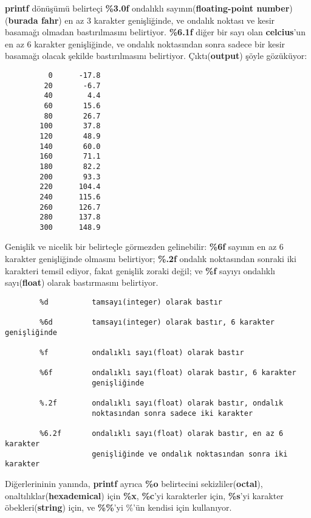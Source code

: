 \documentclass[a4paper,12pt,oneside]{book}
\begin{document}
\par \textbf{printf} dönüşümü belirteçi \textbf{\%3.0f} ondalıklı sayının(\textbf{floating-point number}) (\textbf{burada fahr}) en az 3 karakter genişliğinde, ve ondalık noktası ve kesir basamağı olmadan bastırılmasını belirtiyor. \textbf{\%6.1f} diğer bir sayı olan \textbf{celcius}'un  en az 6 karakter genişliğinde, ve ondalık noktasından sonra sadece bir kesir basamağı olacak şekilde bastırılmasını belirtiyor.
Çıktı(\textbf{output}) şöyle gözüküyor:
\begin{lstlisting}
          0      -17.8
         20       -6.7
         40        4.4
         60       15.6
         80       26.7
        100       37.8
        120       48.9
        140       60.0
        160       71.1
        180       82.2
        200       93.3
        220      104.4
        240      115.6
        260      126.7
        280      137.8
        300      148.9
\end{lstlisting}

Genişlik ve nicelik bir belirteçle görmezden gelinebilir: \textbf{\%6f} sayının en az 6 karakter genişliğinde olmasını belirtiyor; \textbf{\%.2f} ondalık noktasından sonraki iki karakteri temsil ediyor, fakat genişlik zoraki değil; ve \textbf{\%f} sayıyı ondalıklı sayı(\textbf{float}) olarak bastırmasını belirtiyor. \pagebreak

\begin{lstlisting}
        %d          tamsayı(integer) olarak bastır

        %6d         tamsayı(integer) olarak bastır, 6 karakter genişliğinde

        %f          ondalıklı sayı(float) olarak bastır

        %6f         ondalıklı sayı(float) olarak bastır, 6 karakter
                    genişliğinde

        %.2f        ondalıklı sayı(float) olarak bastır, ondalık
                    noktasından sonra sadece iki karakter

        %6.2f       ondalıklı sayı(float) olarak bastır, en az 6 karakter
                    genişliğinde ve ondalık noktasından sonra iki karakter
\end{lstlisting} Diğerlerininin yanında, \textbf{printf} ayrıca \textbf{\%o} belirtecini sekizliler(\textbf{octal}), onaltılıklar(\textbf{hexademical}) için \textbf{\%x}, \textbf{\%c}'yi karakterler için, \textbf{\%s}'yi karakter öbekleri(\textbf{string}) için, ve \textbf{\%\%}'yi \%'ün kendisi için kullanıyor. \\
\end{document}
